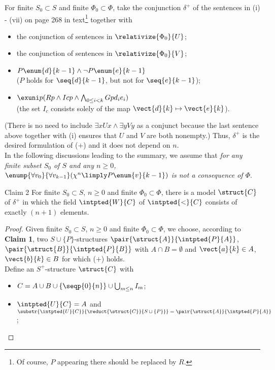 \begin{enumerate}[1.]
For finite $S_0 \subset S$ and finite $\Phi_0 \subset \Phi$, take the conjunction $\delta^+$ of the sentences in (i) - (vii) on page 268 in text\footnote{Of course, $P$ appearing there should be replaced by $R$.} together with
\begin{itemize}
\item the conjunction of sentences in $\relativize{\Phi_0}{U}$;
\item the conjunction of sentences in $\relativize{\Phi_0}{V}$;
\item $P\enum{d}{k - 1} \land \neg P\enum{e}{k - 1}$\\($P$ holds for $\seq{d}{k - 1}$, but not for $\seq{e}{k - 1}$);
\item $\exuni p (Rp \land Icp \land \bigwedge_{0 \leq i < k} Gpd_ie_i)$\\(the set $I_c$ consists solely of the map $\vect{d}{k} \mapsto \vect{e}{k}$).
\end{itemize}
(There is no need to include $\exists x Ux \land \exists y Vy$ as a conjunct because the last sentence above together with (i) ensures that $U$ and $V$ are both nonempty.) Thus, $\delta^+$ is the desired formulation of ($+$) and it does not depend on $n$.\bigskip\\
In the following discussions leading to the summary, we assume that \emph{for any finite subset $S_0$ of $S$ and any $n \geq 0$, $\enump{\forall v_0}{\forall v_{k - 1}} (\chi^n \limply P\enum{v}{k - 1})$ is not a consequence of $\Phi$}.\bigskip\\
\begin{theorem}{Claim 2}
For finite $S_0 \subset S$, $n \geq 0$ and finite $\Phi_0 \subset \Phi$, there is a model $\struct{C}$ of $\delta^+$ in which the field $\intpted{W}{C}$ of $\intpted{<}{C}$ consists of exactly $(n + 1)$ elements.
\end{theorem}
\begin{proof}
Given finite $S_0 \subset S$, $n \geq 0$ and finite $\Phi_0 \subset \Phi$, we choose, according to \textbf{Claim 1}, two $S \cup \{ P \}$-structures $\pair{\struct{A}}{\intpted{P}{A}}$, $\pair{\struct{B}}{\intpted{P}{B}}$ with $A \cap B = \emptyset$ and $\vect{a}{k} \in A$, $\vect{b}{k} \in B$ for which ($+$) holds.\bigskip\\
Define an $S^+$-structure $\struct{C}$ with
\begin{itemize}
\item $C = A \cup B \cup \{\seqp{0}{n}\} \cup \bigcup_{m \leq n} I_m$;
\item $\intpted{U}{C} = A$ and $\substr{\intpted{U}{C}}{\reduct{\struct{C}}{S \cup \{ P \}}} = \pair{\struct{A}}{\intpted{P}{A}}$;

\end{itemize}
\end{proof}
\end{enumerate}
